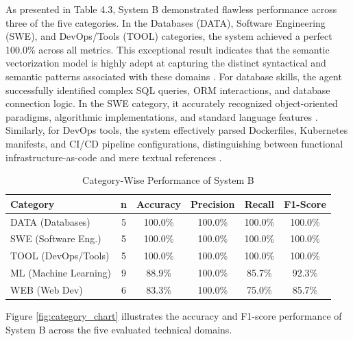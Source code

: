 As presented in Table 4.3, System B demonstrated flawless performance across three of the five categories. In the Databases (DATA), Software Engineering (SWE), and DevOps/Tools (TOOL) categories, the system achieved a perfect 100.0\% across all metrics. This exceptional result indicates that the semantic vectorization model is highly adept at capturing the distinct syntactical and semantic patterns associated with these domains \cite{ref21, ref37}. For database skills, the agent successfully identified complex SQL queries, ORM interactions, and database connection logic. In the SWE category, it accurately recognized object-oriented paradigms, algorithmic implementations, and standard language features \cite{ref14}. Similarly, for DevOps tools, the system effectively parsed Dockerfiles, Kubernetes manifests, and CI/CD pipeline configurations, distinguishing between functional infrastructure-as-code and mere textual references \cite{ref71, ref73}.

\begin{table}[htbp]
\setlength{\tabcolsep}{12pt}
\renewcommand{\arraystretch}{1.2}
\setlength{\tabcolsep}{10pt}
\centering
\small
\caption{Category-Wise Performance of System B}
\label{tab:category_performance}
\begin{tabularx}{\textwidth}{Xc c c c c}
\toprule
\textbf{Category} & \textbf{n} & \textbf{Accuracy} & \textbf{Precision} & \textbf{Recall} & \textbf{F1-Score} \\ \midrule
DATA (Databases) & 5 & 100.0\% & 100.0\% & 100.0\% & 100.0\% \\
SWE (Software Eng.) & 5 & 100.0\% & 100.0\% & 100.0\% & 100.0\% \\
TOOL (DevOps/Tools) & 5 & 100.0\% & 100.0\% & 100.0\% & 100.0\% \\
ML (Machine Learning) & 9 & 88.9\% & 100.0\% & 85.7\% & 92.3\% \\
WEB (Web Dev) & 6 & 83.3\% & 100.0\% & 75.0\% & 85.7\% \\ \bottomrule
\end{tabularx}
\end{table}

Figure \ref{fig:category_chart} illustrates the accuracy and F1-score performance of System B across the five evaluated technical domains.

